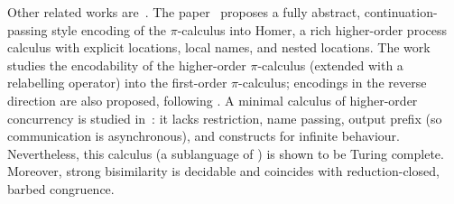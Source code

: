 Other related works are~\cite{BundgaardHG06,XuActa2012,DBLP:journals/iandc/LanesePSS11}.
The paper~\cite{BundgaardHG06} proposes a fully abstract, contin\-u\-a\-tion-passing style encoding of the 
$\pi$-calculus into Homer, a rich higher-order process calculus with explicit locations, local names, and nested locations.
The work~\cite{XuActa2012} studies the encodability of the higher-order $\pi$-calculus (extended with a relabelling operator) into the first-order $\pi$-calculus; encodings in the reverse direction are also proposed, following \cite{Tho90}.
A minimal calculus of higher-order concurrency is studied in~\cite{DBLP:journals/iandc/LanesePSS11}: it lacks restriction,  name passing, output prefix (so  communication is asynchronous), and constructs for infinite behaviour. 
Nevertheless, this calculus (a sublanguage of \HO) is shown to be Turing complete. Moreover, 
strong bisimilarity is decidable and coincides with reduction-closed, barbed congruence. 


